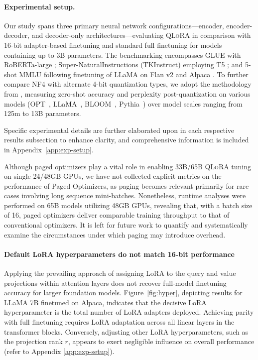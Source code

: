 \paragraph{Experimental setup.} Our study spans three primary neural network configurations—encoder, encoder-decoder, and decoder-only architectures—evaluating \textsc{QLoRA} in comparison with 16-bit adapter-based finetuning and standard full finetuning for models containing up to 3B parameters. The benchmarking encompasses GLUE \citep{wang2018glue} with RoBERTa-large \citep{liu2019roberta}; Super-NaturalInstructions (TKInstruct) \citep{wang2022super} employing T5 \citep{t5}; and 5-shot MMLU \citep{hendrycksmeasuring} following finetuning of LLaMA on Flan v2 \citep{longpre2023flan} and Alpaca \citep{alpaca}. To further compare NF4 with alternate 4-bit quantization types, we adopt the methodology from \citet{dettmers2022case}, measuring zero-shot accuracy and perplexity post-quantization on various models (OPT~\citep{zhang2022opt}, LLaMA~\citep{touvron2023llama}, BLOOM~\citep{scao2022bloom}, Pythia~\citep{biderman2023pythia}) over model scales ranging from 125m to 13B parameters.

Specific experimental details are further elaborated upon in each respective results subsection to enhance clarity, and comprehensive information is included in Appendix~\ref{app:exp-setup}.

Although paged optimizers play a vital role in enabling 33B/65B \textsc{QLoRA} tuning on single 24/48GB GPUs, we have not collected explicit metrics on the performance of Paged Optimizers, as paging becomes relevant primarily for rare cases involving long sequence mini-batches. Nonetheless, runtime analyses were performed on 65B models utilizing 48GB GPUs, revealing that, with a batch size of 16, paged optimizers deliver comparable training throughput to that of conventional optimizers. It is left for future work to quantify and systematically examine the circumstances under which paging may introduce overhead.

\paragraph{Default LoRA hyperparameters do not match 16-bit performance}

Applying the prevailing approach of assigning LoRA to the query and value projections within attention layers \citep{hu2021lora} does not recover full-model finetuning accuracy for larger foundation models. Figure~\ref{fig:hyper}, depicting results for LLaMA 7B finetuned on Alpaca, indicates that the decisive LoRA hyperparameter is the total number of LoRA adapters deployed. Achieving parity with full finetuning requires LoRA adaptation across all linear layers in the transformer blocks. Conversely, adjusting other LoRA hyperparameters, such as the projection rank $r$, appears to exert negligible influence on overall performance (refer to Appendix \ref{app:exp-setup}).

